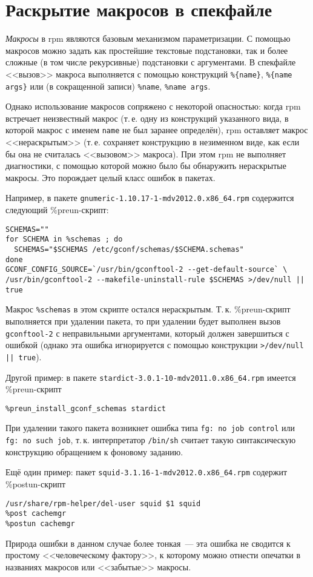 \documentclass[russian,a4paper,12pt,titlepage]{article}
\begin{document}
\section{Раскрытие макросов в спекфайле}
\textit{Макросы} в rpm являются базовым механизмом параметризации.  С помощью
макросов можно задать как простейшие текстовые подстановки, так и более сложные
(в том числе рекурсивные) подстановки с аргументами.  В спекфайле <<вызов>> макроса
выполняется с помощью конструкций \verb|%{name}|, \verb|%{name args}| или (в сокращенной записи)
\verb|%name|, \verb|%name args|.

Однако использование макросов сопряжено с некоторой опасностью: когда rpm встречает неизвестный макрос
(т.\,е. одну из конструкций указанного вида, в которой макрос с именем \verb|name| не был заранее определён),
rpm оставляет макрос <<нераскрытым>> (т.\,е. сохраняет конструкцию в незименном виде, как если бы она не считалась
<<вызовом>> макроса).  При этом rpm не выполняет диагностики, с помощью которой можно было бы обнаружить
нераскрытые макросы.  Это порождает целый класс ошибок в пакетах.

Например, в пакете \verb|gnumeric-1.10.17-1-mdv2012.0.x86_64.rpm| содержится следующий \%preun-скрипт:
\begin{verbatim}
SCHEMAS=""
for SCHEMA in %schemas ; do
  SCHEMAS="$SCHEMAS /etc/gconf/schemas/$SCHEMA.schemas"
done
GCONF_CONFIG_SOURCE=`/usr/bin/gconftool-2 --get-default-source` \
/usr/bin/gconftool-2 --makefile-uninstall-rule $SCHEMAS >/dev/null || true
\end{verbatim}
Макрос \verb|%schemas| в этом скрипте остался нераскрытым.  Т.\,к. \%preun-скрипт
выполняется при удалении пакета, то при удалении будет выполнен вызов \verb|gconftool-2|
с неправильными аргументами, который должен завершиться с ошибкой (однако эта ошибка игнорируется
с помощью конструкции \texttt{>/dev/null || true}).

Другой пример: в пакете \verb|stardict-3.0.1-10-mdv2011.0.x86_64.rpm| имеется \%preun-скрипт
\begin{verbatim}
%preun_install_gconf_schemas stardict
\end{verbatim}
При удалении такого пакета возникнет ошибка типа \texttt{fg: no job control} или \texttt{fg: no such job},
т.\,к. интерпретатор \verb|/bin/sh| считает такую синтаксическую конструкцию обращением к фоновому заданию.

Ещё один пример: пакет \verb|squid-3.1.16-1-mdv2012.0.x86_64.rpm| содержит \%postun-скрипт
\begin{verbatim}
/usr/share/rpm-helper/del-user squid $1 squid
%post cachemgr
%postun cachemgr
\end{verbatim}
Природа ошибки в данном случае более тонкая~--- эта ошибка не сводится к простому <<человеческому фактору>>,
к которому можно отнести опечатки в названиях макросов или <<забытые>> макросы.
\end{document}
